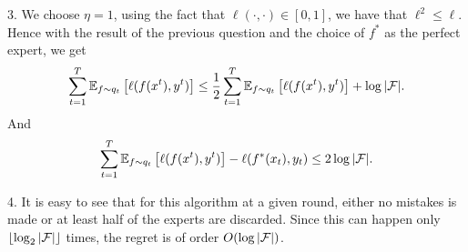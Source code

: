 \begin{solution}[]
3. We choose $ \eta = 1$, using the fact that $ \ell(\cdot ,\cdot ) \in [0,1] $, we have that $ \ell^2 \leq \ell $.
Hence with the result of the previous question and the choice of $ f^{*} $ as the perfect expert, we get 
\begin{equation*}
	\sum_{t=1}^{T} \EEs{\ell(f(x^t),y^t)}{f\sim q_t} \leq \frac{1}{2} \sum_{t=1}^{T}\EEs{\ell(f(x^t),y^t)}{f\sim
	q_t} +  \log |\F|.
\end{equation*}
And 
\begin{equation*}
	\sum_{t=1}^{T}\EEs{\ell(f(x^t),y^t)}{f \sim q_t} - \ell(f^{*}(x_t),y_t) \leq 2 \log |\F|.
\end{equation*}

4. It is easy to see that for this algorithm at a given round, either no mistakes is made or at least half of the
experts are discarded. Since this can happen only $ \lfloor{\log_2|\F|}\rfloor $ times, the regret is of order $ O(\log |\F|)
$.



\end{solution}
